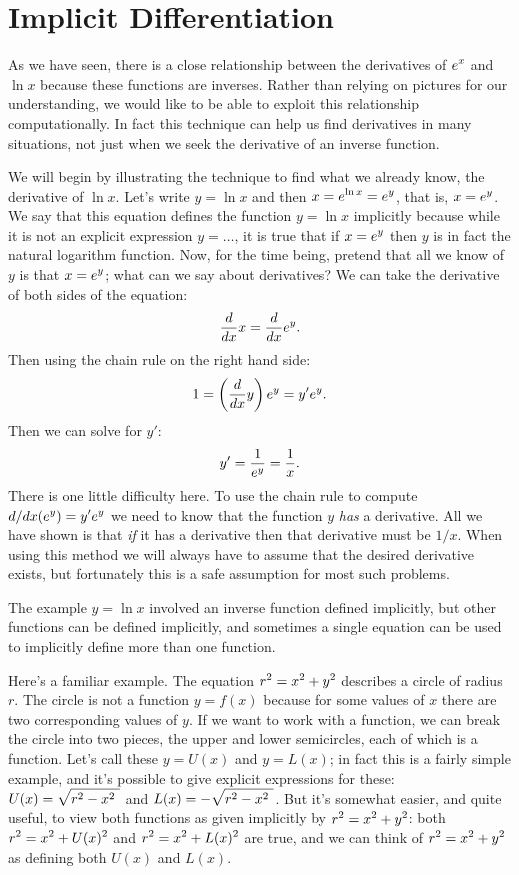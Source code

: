 \section{Implicit Differentiation}{}{}

As we have seen, there is a close relationship 
between the derivatives of $\displaystyle e^x$ and $\ln x$ because these functions
are inverses. Rather than relying on pictures for our understanding,
we would like to be able to exploit this relationship
computationally.  In fact this technique can help us find derivatives
in many situations, not just when we seek the derivative of an inverse
function. 

We will begin by illustrating the technique to find what we already
know, the derivative of $\ln x$. Let's write $y=\ln x$ and then
$\displaystyle x=e^{\ln x}=e^y$, that is, $\displaystyle x=e^y$. We say that this equation
defines the function $y=\ln x$ 
implicitly
because while it is not an explicit expression $y=\ldots$, it is true
that if $\displaystyle x=e^y$ then $y$ is in fact the natural logarithm
function. Now, for the time being, pretend that all we know of $y$ is
that $\displaystyle x=e^y$; what can we say about derivatives? We can take the
derivative of both sides of the equation:
$${d\over dx}x={d\over dx}e^y.$$
Then using the chain rule on the right hand side:
$$1 = \left({d\over dx}y\right) e^y = y'e^y.$$
Then we can solve for $y'$:
$$y'={1\over e^y} = {1\over x}.$$
There is one little difficulty here. To use the chain rule to compute 
$\displaystyle d/dx(e^y)=y'e^y$ we need to know that the function $y$ {\it has\/} a
derivative. All we have shown is that {\it if\/} it has a derivative
then that derivative must be $1/x$. When using this method we will
always have to assume that the desired derivative exists, but
fortunately this is a safe assumption for most such problems. 

The example $y=\ln x$ involved an inverse function defined implicitly,
but other functions can be defined implicitly, and sometimes a single
equation can be used to implicitly define more than one
function. 

Here's a familiar example. The equation $\displaystyle r^2=x^2+y^2$
describes a circle of radius $r$. The circle is not a function
$y=f(x)$ because for some values of $x$ there are two corresponding
values of $y$. If we want to work with a function, we can break the
circle into two pieces, the upper and lower semicircles, each of which
is a function. Let's call these $y=U(x)$ and $y=L(x)$; in fact this is
a fairly simple example, and it's possible to give explicit
expressions for these: $\displaystyle U(x)=\sqrt{r^2-x^2\ }$ and
$\displaystyle L(x)=-\sqrt{r^2-x^2\ }$.  But it's somewhat easier, and quite useful,
to view both functions as given implicitly by $\displaystyle r^2=x^2+y^2$: both
$\displaystyle r^2=x^2+U(x)^2$ and $\displaystyle r^2=x^2+L(x)^2$ are true, and we can think of 
$\displaystyle r^2=x^2+y^2$ as defining both $U(x)$ and $L(x)$.

